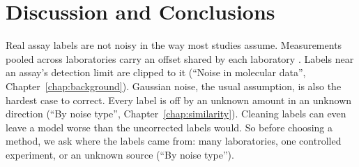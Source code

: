 \chapter{Discussion and Conclusions}\label{chap:discussion}

Real assay labels are not noisy in the way most studies assume. Measurements pooled across laboratories carry an offset shared by each laboratory \citep{Bentz2013}. Labels near an assay's detection limit are clipped to it \citep{Svensson2025} (``Noise in molecular data'', Chapter~\ref{chap:background}). Gaussian noise, the usual assumption, is also the hardest case to correct. Every label is off by an unknown amount in an unknown direction (``By noise type'', Chapter~\ref{chap:similarity}). Cleaning labels can even leave a model worse than the uncorrected labels would. So before choosing a method, we ask where the labels came from: many laboratories, one controlled experiment, or an unknown source (``By noise type'').

